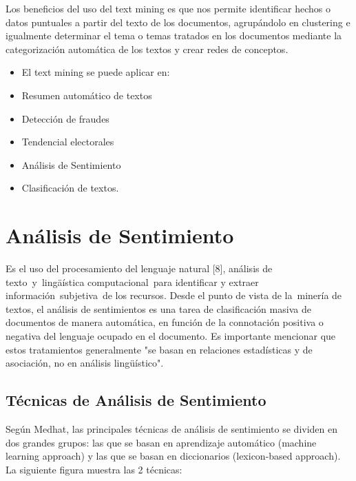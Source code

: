 Los beneficios del uso del text mining es que nos permite identificar hechos o datos puntuales a partir del texto de los documentos, agrup\'andolo en clustering e igualmente determinar el tema o temas tratados en los documentos mediante la categorizaci\'on autom\'atica de los textos y crear redes de conceptos.
		
\begin{itemize}
\item El text mining  se puede aplicar en:
\item Resumen autom\'atico de textos
\item Detecci\'on de fraudes
\item Tendencial electorales
\item An\'alisis de Sentimiento
\item Clasificaci\'on de textos.
\end{itemize}

\section{An\'alisis de Sentimiento}

Es el uso del procesamiento del lenguaje natural [8], an\'alisis de texto y ling\"aística computacional para identificar y extraer informaci\'on subjetiva de los recursos. Desde el punto de vista de la minería de textos, el an\'alisis de sentimientos es una tarea de clasificaci\'on masiva de documentos de manera autom\'atica, en funci\'on de la connotaci\'on positiva o negativa del lenguaje ocupado en el documento. Es importante mencionar que estos tratamientos generalmente "se basan en relaciones estad\'isticas y de asociaci\'on, no en an\'alisis ling\"uístico".

\subsection{T\'ecnicas de An\'alisis de Sentimiento}

Seg\'un Medhat, las principales t\'ecnicas de an\'alisis de sentimiento se dividen en dos grandes grupos: las que se basan en aprendizaje autom\'atico (machine learning approach) y las que se basan en diccionarios (lexicon-based approach). \\

La siguiente figura muestra las 2 técnicas:\\

